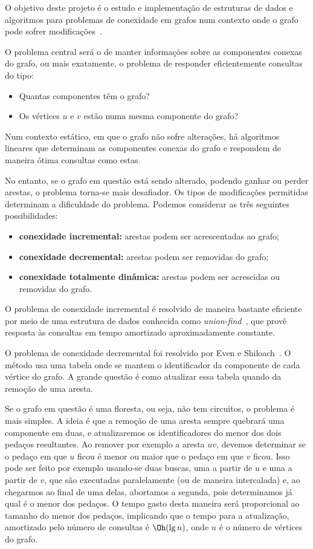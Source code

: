 O objetivo deste projeto é o estudo e implementação de estruturas de dados e algoritmos 
para problemas de conexidade em grafos num contexto onde o grafo pode sofrer 
modificações~\cite{DemetrescuFI2004}.  

O problema central será o de manter informações sobre as componentes conexas do grafo, 
ou mais exatamente, o problema de responder eficientemente consultas do tipo: 
\begin{itemize}
\item Quantas componentes têm o grafo?
\item Os vértices $u$ e $v$ estão numa mesma componente do grafo?
\end{itemize}

Num contexto estático, em que o grafo não sofre alterações, há algoritmos lineares que 
determinam as componentes conexas do grafo e respondem de maneira ótima consultas como estas.

No entanto, se o grafo em questão está sendo alterado, podendo ganhar ou perder arestas, 
o problema torna-se mais desafiador.  Os tipos de modificações permitidas determinam 
a dificuldade do problema.  Podemos considerar as três seguintes possibilidades: 
\begin{itemize}
\item {\bf conexidade incremental:} arestas podem ser acrescentadas ao grafo; 
\item {\bf conexidade decremental:} arestas podem ser removidas do grafo;
\item {\bf conexidade totalmente dinâmica:} arestas podem ser acrescidas ou removidas do grafo.
\end{itemize}

O problema de conexidade incremental é resolvido de maneira bastante eficiente por meio de 
uma estrutura de dados conhecida como \emph{union-find}~\cite{Tarjan1975}, que provê resposta 
às consultas em tempo amortizado aproximadamente constante. 

O problema de conexidade decremental foi resolvido por Even e Shiloach~\cite{EvenS1981}.  
O método usa uma tabela onde se mantem o identificador da componente de cada vértice do grafo.  
A grande questão é como atualizar essa tabela quando da remoção de uma aresta. 

Se o grafo em questão é uma floresta, ou seja, não tem circuitos, o problema é mais simples.  
A ideia é que a remoção de uma aresta sempre quebrará uma componente em duas, e atualizaremos
os identificadores do menor dos dois pedaços resultantes.  Ao remover por exemplo a aresta $uv$, 
devemos determinar se o pedaço em que $u$ ficou é menor ou maior que o pedaço em que $v$ ficou.  
Isso pode ser feito por exemplo usando-se duas buscas, uma a partir de $u$ e uma a partir de $v$, 
que são executadas paralelamente (ou de maneira intercalada) e, ao chegarmos ao final de uma delas, 
abortamos a segunda, pois determinamos já qual é o menor dos pedaços.  O tempo gasto desta maneira 
será proporcional ao tamanho do menor dos pedaços, implicando que o tempo para a atualização, 
amortizado pelo número de consultas é $\Oh(\lg n)$, onde $n$ é o número de vértices do grafo.

